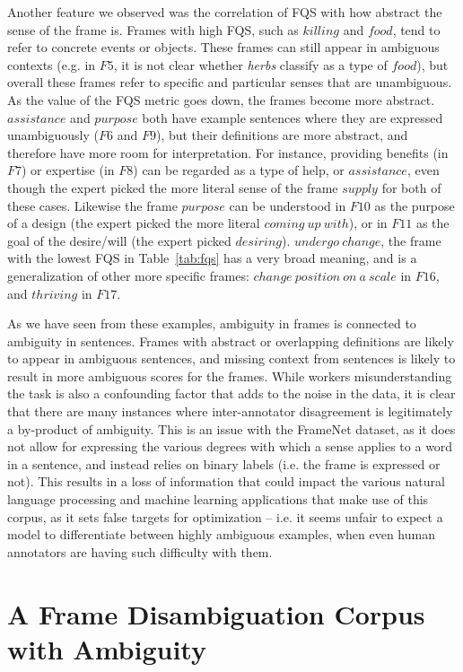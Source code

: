 Another feature we observed was the correlation of FQS with how abstract the sense of the frame is. Frames with high FQS, such as $killing$ and $food$, tend to refer to concrete events or objects. These frames can still appear in ambiguous contexts (e.g. in $F5$, it is not clear whether \textit{herbs} classify as a type of $food$), but overall these frames refer to specific and particular senses that are unambiguous. As the value of the FQS metric goes down, the frames become more abstract. $assistance$ and $purpose$ both have example sentences where they are expressed unambiguously ($F6$ and $F9$), but their definitions are more abstract, and therefore have more room for interpretation. For instance, providing benefits (in $F7$) or expertise (in $F8$) can be regarded as a type of help, or $assistance$, even though the expert picked the more literal sense of the frame $supply$ for both of these cases. Likewise the frame $purpose$ can be understood in $F10$ as the purpose of a design (the expert picked the more literal $coming\ up\ with$), or in $F11$ as the goal of the desire/will (the expert picked $desiring$). $undergo\ change$, the frame with the lowest FQS in Table~\ref{tab:fqs} has a very broad meaning, and is a generalization of other more specific frames: $change\ position\ on\ a\ scale$ in $F16$, and $thriving$ in $F17$.

As we have seen from these examples, ambiguity in frames is connected to ambiguity in sentences. Frames with abstract or overlapping definitions are likely to appear in ambiguous sentences, and missing context from sentences is likely to result in more ambiguous scores for the frames. While workers misunderstanding the task is also a confounding factor that adds to the noise in the data, it is clear that there are many instances where inter-annotator disagreement is legitimately a by-product of ambiguity. This is an issue with the FrameNet dataset, as it does not allow for expressing the various degrees with which a sense applies to a word in a sentence, and instead relies on binary labels (i.e. the frame is expressed or not). This results in a loss of information that could impact the various natural language processing and machine learning applications that make use of this corpus, as it sets false targets for optimization -- i.e. it seems unfair to expect a model to differentiate between highly ambiguous examples, when even human annotators are having such difficulty with them. \\


\section{A Frame Disambiguation Corpus with Ambiguity}
\label{sec:frame-disambig-eval}

